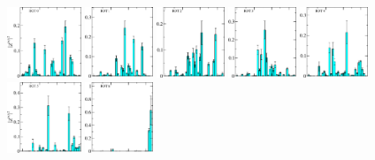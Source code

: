 \begin{figure}[H]
    \includegraphics[width=0.1975\textwidth]{figures/sigmas/g2g/zfactors/zfactor_isotriplet-S-1-P000-G2g_1-ROT-0.pdf}
    \includegraphics[width=0.18\textwidth]{figures/sigmas/g2g/zfactors/zfactor_isotriplet-S-1-P000-G2g_1-ROT-1.pdf}
    \includegraphics[width=0.18\textwidth]{figures/sigmas/g2g/zfactors/zfactor_isotriplet-S-1-P000-G2g_1-ROT-2.pdf}
    \includegraphics[width=0.18\textwidth]{figures/sigmas/g2g/zfactors/zfactor_isotriplet-S-1-P000-G2g_1-ROT-3.pdf}
    \includegraphics[width=0.18\textwidth]{figures/sigmas/g2g/zfactors/zfactor_isotriplet-S-1-P000-G2g_1-ROT-4.pdf}\\
    \includegraphics[width=0.1975\textwidth]{figures/sigmas/g2g/zfactors/zfactor_isotriplet-S-1-P000-G2g_1-ROT-5.pdf}
    \includegraphics[width=0.18\textwidth]{figures/sigmas/g2g/zfactors/zfactor_isotriplet-S-1-P000-G2g_1-ROT-6.pdf}

\end{figure}
